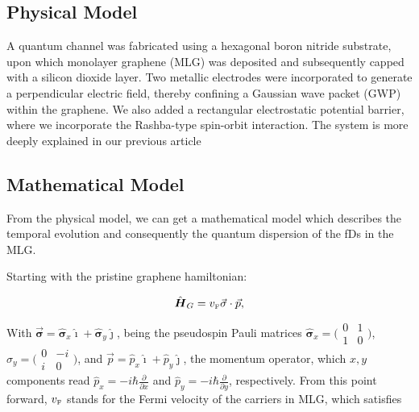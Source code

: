 \subsection{Physical Model}\label{subsec:physical-model}

A quantum channel was fabricated using a hexagonal boron nitride substrate, upon which monolayer graphene (MLG) was deposited and subsequently capped with a silicon dioxide layer.
Two metallic electrodes were incorporated to generate a perpendicular electric field, thereby confining a Gaussian wave packet (GWP) within the graphene.
We also added a rectangular electrostatic potential barrier, where we incorporate the Rashba-type spin-orbit interaction.
The system is more deeply explained in our previous article\cite{Serna2019}


\subsection{Mathematical Model}\label{subsec:mathematical-model}

From the physical model, we can get a mathematical model which describes the temporal evolution and consequently the quantum dispersion of the fDs in the MLG\@.

Starting with the pristine graphene hamiltonian\cite{Geimk2007}:

\begin{equation}
    \label{eq:pristGr}
    \hat{\mbox{\boldmath $H$}}_G = v_{\mbox{\tiny F}}\vec{\mathbf{\sigma}}\cdot\vec{p},
\end{equation}

\noindent With $\vec{\mathbf{\sigma}} = \hat{\mathbf{\sigma}}_{x}\hat{\imath} + \hat{\mathbf{\sigma}}_{y}\hat{\jmath}$, being the pseudospin Pauli matrices $\hat{\mathbf{\sigma}}_{x} = \bigl(\begin{smallmatrix}
                                                                                                                                                                                                   0&1 \\ 1&0
\end{smallmatrix} \bigr)$, $\hat{\sigma}_{y} = \bigl(\begin{smallmatrix}
                                                         0&-i \\ i&0
\end{smallmatrix} \bigr)$, and $\vec{p}=\hat{p}_{x}\hat{\imath}+\hat{p}_{y}\hat{\jmath}$, the momentum operator, which $x, y$ components read $\hat{p}_{x} = -i\hbar\frac{\partial}{\partial x}$ and $\hat{p}_{y} = -i\hbar\frac{\partial}{\partial y}$, respectively.
From this point forward, $v_{\mbox{\tiny F}}$ stands for the Fermi velocity of the carriers in MLG, which satisfies

